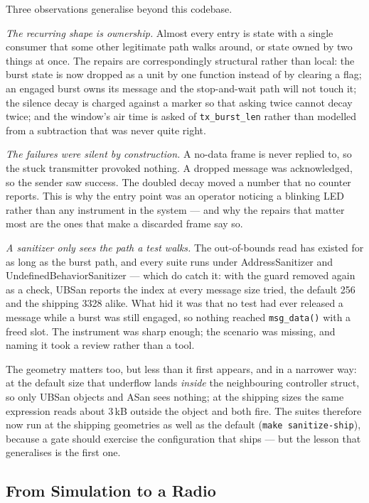 Three observations generalise beyond this codebase.

\emph{The recurring shape is ownership.}  Almost every entry is state
with a single consumer that some other legitimate path walks around, or
state owned by two things at once.  The repairs are correspondingly
structural rather than local: the burst state is now dropped as a unit
by one function instead of by clearing a flag; an engaged burst owns its
message and the stop-and-wait path will not touch it; the
silence decay is charged against a marker so that asking twice cannot
decay twice; and the window's air time is asked of
\texttt{tx\_burst\_len} rather than modelled from a subtraction that was
never quite right.

\emph{The failures were silent by construction.}  A no-data frame is
never replied to, so the stuck transmitter provoked nothing.  A dropped
message was acknowledged, so the sender saw success.  The doubled decay
moved a number that no counter reports.  This is why the entry point was
an operator noticing a blinking LED rather than any instrument in the
system --- and why the repairs that matter most are the ones that make a
discarded frame say so.

\emph{A sanitizer only sees the path a test walks.}  The
out-of-bounds read has existed for as long as the burst path, and every
suite runs under AddressSanitizer and UndefinedBehaviorSanitizer ---
which do catch it: with the guard removed again as a check, UBSan
reports the index at every message size tried, the default 256 and the
shipping 3328 alike.  What hid it was that no test had ever released a
message while a burst was still engaged, so nothing reached
\texttt{msg\_data()} with a freed slot.  The instrument was sharp
enough; the scenario was missing, and naming it took a review rather
than a tool.

The geometry matters too, but less than it first appears, and in a
narrower way: at the default size that underflow lands \emph{inside} the
neighbouring controller struct, so only UBSan objects and ASan sees
nothing; at the shipping sizes the same expression reads about 3\,kB
outside the object and both fire.  The suites therefore now run at the
shipping geometries as well as the default (\texttt{make
sanitize-ship}), because a gate should exercise the configuration that
ships --- but the lesson that generalises is the first one.

\subsection{From Simulation to a Radio}
\label{sec:cport_sdr}

